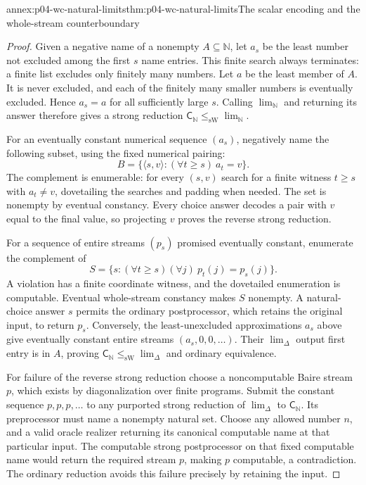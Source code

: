 \begin{annexitem}{annex:p04-wc-natural-limits}{thm:p04-wc-natural-limits}{The scalar encoding and the whole-stream counterboundary}
\begin{proof}
Given a negative name of a nonempty \(A\subseteq\mathbb N\),
let \(a_s\) be the least number not excluded among the first \(s\)
name entries. This finite search always terminates: a finite list
excludes only finitely many numbers. Let \(a\) be the least member
of \(A\). It is never excluded, and each of the finitely many smaller
numbers is eventually excluded. Hence \(a_s=a\) for all sufficiently
large \(s\). Calling \(\lim_{\mathbb N}\) and returning its answer
therefore gives a strong reduction \(\mathsf{C}_{\mathbb N}\leq_{\mathrm{sW}}\lim_{\mathbb N}\).

For an eventually constant numerical sequence \((a_s)\), negatively
name the following subset, using the fixed numerical pairing:
\[
 B=\{\langle s,v\rangle:(\forall t\geq s)\ a_t=v\}.
\]
The complement is enumerable: for every \((s,v)\) search for a
finite witness \(t\geq s\) with \(a_t\ne v\), dovetailing the
searches and padding when needed. The set is nonempty by eventual
constancy. Every choice answer decodes a pair with \(v\) equal to
the final value, so projecting \(v\) proves the reverse strong reduction.

For a sequence of entire streams \((p_s)\) promised eventually
constant, enumerate the complement of
\[
 S=\{s:(\forall t\geq s)(\forall j)\ p_t(j)=p_s(j)\}.
\]
A violation has a finite coordinate witness, and the dovetailed
enumeration is computable. Eventual whole-stream constancy makes
\(S\) nonempty. A natural-choice answer \(s\) permits the ordinary
postprocessor, which retains the original input, to return \(p_s\).
Conversely, the least-unexcluded approximations \(a_s\) above
give eventually constant entire streams \((a_s,0,0,\ldots)\).
Their \(\lim_\Delta\) output first entry is in \(A\), proving
\(\mathsf{C}_{\mathbb N}\leq_{\mathrm{sW}}\lim_\Delta\) and ordinary equivalence.

For failure of the reverse strong reduction choose a noncomputable
Baire stream \(p\), which exists by diagonalization over finite
programs. Submit the constant sequence \(p,p,p,\ldots\) to any
purported strong reduction of \(\lim_\Delta\) to \(\mathsf{C}_{\mathbb N}\).
Its preprocessor must name a nonempty natural set. Choose any allowed
number \(n\), and a valid oracle realizer returning its canonical
computable name at that particular input. The computable strong
postprocessor on that fixed computable name would return the required
stream \(p\), making \(p\) computable, a contradiction. The
ordinary reduction avoids this failure precisely by retaining the input.
\end{proof}
\end{annexitem}

